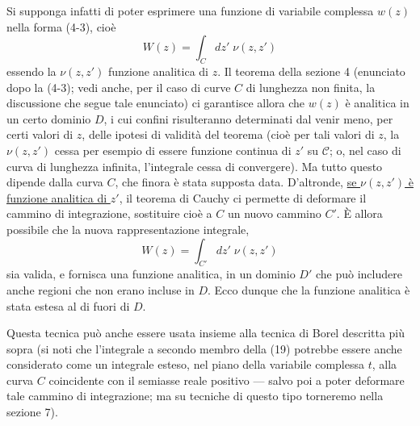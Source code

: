 \documentclass[11pt, a4paper]{book}
\numberwithin{equation}{section}
\begin{document}
Si supponga infatti di poter esprimere una funzione di variabile complessa $w(z)$ nella forma (4-3), cioè
\begin{equation}
W(z) = \int_C dz'\; \nu(z, z') \tag{20}
\end{equation}
essendo la $\nu(z,z')$ funzione analitica di $z$. Il teorema della sezione 4 (enunciato dopo la (4-3); vedi anche, per il caso di curve $C$ di lunghezza non finita, la discussione che segue tale enunciato) ci garantisce allora che $w(z)$ è analitica in un certo dominio $D$, i cui confini risulteranno determinati dal venir meno, per certi valori di $z$, delle ipotesi di validità del teorema (cioè per tali valori di $z$, la $\nu(z,z')$ cessa per esempio di essere funzione continua di $z'$ su $\mathcal{C}$; o, nel caso di curva di lunghezza infinita, l'integrale cessa di convergere). Ma tutto questo dipende dalla curva $C$, che finora è stata supposta data. D'altronde, \uline{se $\nu(z,z')$ è funzione analitica di $z'$}, il teorema di Cauchy ci permette di deformare il cammino di integrazione, sostituire cioè a $C$ un nuovo cammino $C'$. È allora possibile che la nuova rappresentazione integrale,
\begin{equation}
W(z) = \int_{C'} dz'\; \nu(z, z') \tag{21}
\end{equation}
sia valida, e fornisca una funzione analitica, in un dominio $D'$ che può includere anche regioni che non erano incluse in $D$. Ecco dunque che la funzione analitica è stata estesa al di fuori di $D$.

Questa tecnica può anche essere usata insieme alla tecnica di Borel descritta più sopra (si noti che l'integrale a secondo membro della (19) potrebbe essere anche considerato come un integrale esteso, nel piano della variabile complessa $t$, alla curva $C$ coincidente con il semiasse reale positivo — salvo poi a poter deformare tale cammino di integrazione; ma su tecniche di questo tipo torneremo nella sezione 7).
\end{document}
